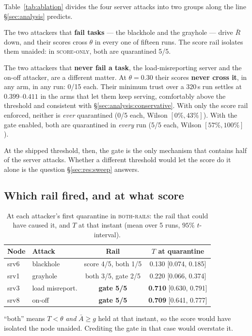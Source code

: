 \documentclass[10pt,twocolumn,letterpaper]{article}
\newcommand{\Tscore}{T}
\newcommand{\Agate}{\bar{A}}
\newcommand{\armscore}{\textsc{score-only}}
\newcommand{\armfull}{\textsc{both-rails}}
\begin{document}
Table~\ref{tab:ablation} divides the four server attacks into two groups along
the line \S\ref{sec:analysis} predicts.

The two attackers that \textbf{fail tasks} --- the blackhole and the grayhole ---
drive $\bar{R}$ down, and their scores cross $\theta$ in every one of fifteen
runs. The score rail isolates them unaided: in \armscore{}, both are
quarantined 5/5.

The two attackers that \textbf{never fail a task}, the load-misreporting server
and the on-off attacker, are a different matter. At $\theta = 0.30$ their scores
\textbf{never cross it}, in any arm, in any run: 0/15 each. Their minimum trust over a
$320$\,s run settles at $0.399$--$0.411$ in the arms that let them keep serving,
comfortably above the threshold and consistent with
\S\ref{sec:analysis:conservative}. With only the score rail enforced, neither
is \emph{ever} quarantined (0/5 each, Wilson $[0\%, 43\%]$). With the gate
enabled, both are quarantined in \emph{every} run (5/5 each, Wilson
$[57\%, 100\%]$).

At the shipped threshold, then, the gate is the only mechanism that contains
half of the server attacks. Whether a different threshold would let the score do
it alone is the question \S\ref{sec:res:sweep} answers.

\subsection{Which rail fired, and at what score}
\label{sec:res:rails}

\begin{table}[t]
\caption{At each attacker's first quarantine in \armfull{}: the rail that could
have caused it, and $\Tscore$ at that instant (mean over 5 runs,
$95\%$ $t$-interval).}
\label{tab:rails}
\centering\footnotesize
\begin{tabular}{@{}llcc@{}}
\toprule
\textbf{Node} & \textbf{Attack} & \textbf{Rail} & $\Tscore$ \textbf{at quarantine}\\
\midrule
srv6 & blackhole & score 4/5, both 1/5 & 0.130 [0.074, 0.185]\\
srv1 & grayhole  & both 3/5, gate 2/5  & 0.220 [0.066, 0.374]\\
srv3 & load misreport. & \textbf{gate 5/5}   & \textbf{0.710} [0.630, 0.791]\\
srv8 & on-off    & \textbf{gate 5/5}   & \textbf{0.709} [0.641, 0.777]\\
\bottomrule
\end{tabular}

\vspace{3pt}
\begin{minipage}{\columnwidth}\scriptsize
``both'' means $\Tscore < \theta$ \emph{and} $\Agate \ge g$ held at that
instant, so the score would have isolated the node unaided. Crediting the gate
in that case would overstate it.
\end{minipage}
\end{table}
\end{document}
